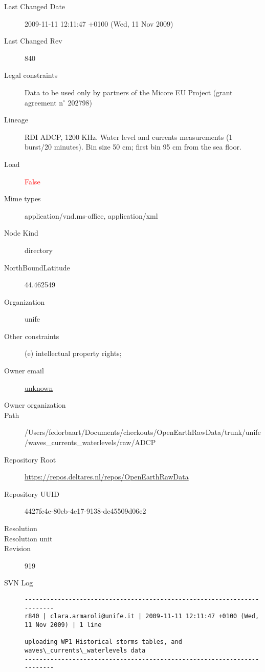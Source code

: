 \documentclass[9]{report}
\begin{document}
\begin{description}
  \item[Last Changed Date] 2009-11-11 12:11:47 +0100 (Wed, 11 Nov 2009)
  \item[Last Changed Rev] 840
  \item[Legal constraints] Data to be used only by partners of the Micore EU Project (grant agreement n\mbox{$^\circ$} 202798)
  \item[Lineage] RDI ADCP, 1200 KHz. Water level and currents measurements (1 burst/20 minutes). Bin size 50 cm; first bin 95 cm from the sea floor.
  \item[Load] \textcolor{red}{False}
  \item[Mime types] application/vnd.ms-office, application/xml
  \item[Node Kind] directory
  \item[NorthBoundLatitude] 44.462549
  \item[Organization] unife
  \item[Other constraints] (e) intellectual property rights;
  \item[Owner email] \href{mailto:unknown}{unknown}
  \item[Owner organization] 
  \item[Path] /Users/fedorbaart/Documents/checkouts/OpenEarthRawData/trunk/unife/waves\_currents\_waterlevels/raw/ADCP
  \item[Repository Root] \href{https://repos.deltares.nl/repos/OpenEarthRawData}{https://repos.deltares.nl/repos/OpenEarthRawData}
  \item[Repository UUID] 4427fc4e-80cb-4e17-9138-dc45509d06e2
  \item[Resolution] 
  \item[Resolution unit] 
  \item[Revision] 919
  \item[SVN Log] \begin{verbatim}
------------------------------------------------------------------------
r840 | clara.armaroli@unife.it | 2009-11-11 12:11:47 +0100 (Wed, 11 Nov 2009) | 1 line

uploading WP1 Historical storms tables, and waves\_currents\_waterlevels data
------------------------------------------------------------------------


\end{verbatim}
\end{description}
\end{document}
